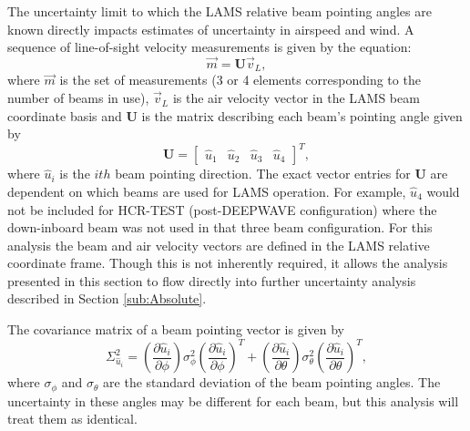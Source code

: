 \documentclass[12pt,twoside,english]{article}\usepackage[]{graphicx}\usepackage[]{color}
\begin{document}
The uncertainty limit to which the LAMS relative beam pointing angles are known directly impacts estimates of uncertainty in airspeed and wind. A sequence of line-of-sight velocity measurements is given by the equation:  
\begin{equation}
\vec{m}=\mathbf{U}\vec{v}_{L},\label{Vmeas}
\end{equation}
where $\vec{m}$ is the set of measurements (3 or 4 elements corresponding to the number of beams in use), $\vec{v}_{L}$ is the air velocity vector in the LAMS beam coordinate basis and $\mathbf{U}$ is the matrix describing each beam's pointing angle given by  
\begin{equation}
\mathbf{U}=\left[\begin{array}{cccc} \hat{u}_{1} & \hat{u}_{2} & \hat{u}_{3} & \hat{u}_{4}\end{array}\right]^{T},\label{Umatrix}
\end{equation}
where $\hat{u}_{i}$ is the $ith$ beam pointing direction. The exact vector entries for $\mathbf{U}$ are dependent on which beams are used for LAMS operation. For example, $\hat{u}_{4}$ would not be included for HCR-TEST (post-DEEPWAVE configuration) where the down-inboard beam was not used in that three beam configuration. For this analysis the beam and air velocity vectors are defined in the LAMS relative coordinate frame. Though this is not inherently required, it allows the analysis presented in this section to flow directly into further uncertainty analysis described in Section \ref{sub:Absolute}. 

The covariance matrix of a beam pointing vector is given by  
\begin{equation}
\Sigma_{\hat{u}_{i}}^{2}=\left(\frac{\partial\hat{u}_{i}}{\partial\phi}\right)\sigma_{\phi}^{2}\left(\frac{\partial\hat{u}_{i}}{\partial\phi}\right)^{T}+\left(\frac{\partial\hat{u}_{i}}{\partial\theta}\right)\sigma_{\theta}^{2}\left(\frac{\partial\hat{u}_{i}}{\partial\theta}\right)^{T},\label{CovUvec} 
\end{equation}
where $\sigma_{\phi}$ and $\sigma_{\theta}$ are the standard deviation of the beam pointing angles. The uncertainty in these angles may be different for each beam, but this analysis will treat them as identical. 
\end{document}
